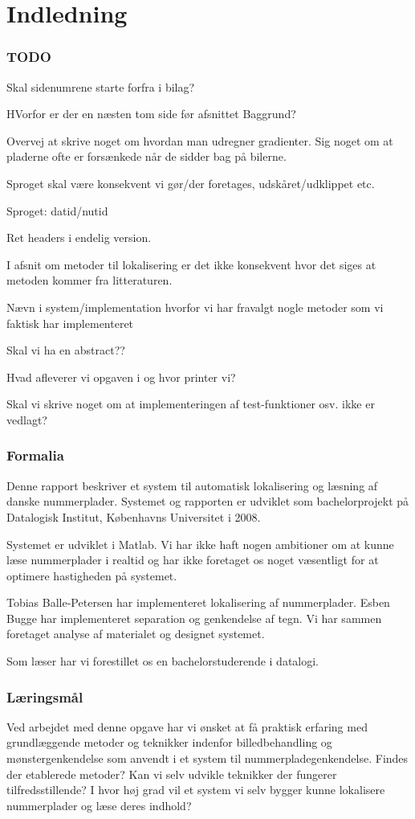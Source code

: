 \section{Indledning}

\subsubsection*{TODO}
Skal sidenumrene starte forfra i bilag?

HVorfor er der en næsten tom side før afsnittet Baggrund?

Overvej at skrive noget om hvordan man udregner gradienter.
Sig noget om at pladerne ofte er forsænkede når de sidder bag på bilerne.

Sproget skal være konsekvent vi gør/der foretages, udskåret/udklippet etc.

Sproget: datid/nutid

Ret headers i endelig version.

I afsnit om metoder til lokalisering er det ikke konsekvent hvor det siges at metoden kommer fra litteraturen.

Nævn i system/implementation hvorfor vi har fravalgt nogle metoder som vi faktisk har implementeret

Skal vi ha en abstract??

Hvad afleverer vi opgaven i og hvor printer vi?

Skal vi skrive noget om at implementeringen af test-funktioner osv. ikke er vedlagt?

\subsubsection*{Formalia}
Denne rapport beskriver et system til automatisk lokalisering og læsning af danske nummerplader. Systemet og rapporten er udviklet som bachelorprojekt på Datalogisk Institut, Københavns Universitet i 2008.

Systemet er udviklet i Matlab. Vi har ikke haft nogen ambitioner om at kunne læse nummerplader i realtid og har ikke foretaget os noget væsentligt for at optimere hastigheden på systemet.

Tobias Balle-Petersen har implementeret lokalisering af nummerplader. Esben Bugge har implementeret separation og genkendelse af tegn. Vi har sammen foretaget analyse af materialet og designet systemet. 

Som læser har vi forestillet os en bachelorstuderende i datalogi.

\subsubsection*{Læringsmål}
Ved arbejdet med denne opgave har vi ønsket at få praktisk erfaring med grundlæggende metoder og teknikker indenfor billedbehandling og mønstergenkendelse som anvendt i et system til nummerpladegenkendelse. Findes der etablerede metoder? Kan vi selv udvikle teknikker der fungerer tilfredsstillende? I hvor høj grad vil et system vi selv bygger kunne lokalisere nummerplader og læse deres indhold?

